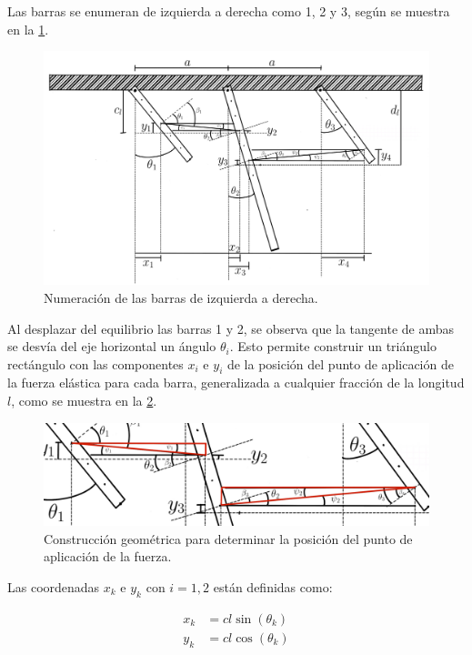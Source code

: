 Las barras se enumeran de izquierda a derecha como 1, 2 y 3, según se muestra en la \cref{fig:enumeracion_barras}.

\begin{figure}[htbp!]
    \centering
    \includegraphics[width=0.8\linewidth]{Figures/Ilustración_sin_título 4.pdf}
    \caption{Numeración de las barras de izquierda a derecha.}
    \label{fig:enumeracion_barras}
\end{figure}

Al desplazar del equilibrio las barras 1 y 2, se observa que la tangente de ambas se desvía del eje horizontal un ángulo \(\theta_i\). Esto permite construir un triángulo rectángulo con las componentes \(x_i\) e \(y_i\) de la posición del punto de aplicación de la fuerza elástica para cada barra, generalizada a cualquier fracción de la longitud \(l\), como se muestra en la \cref{fig:triangulo_posicion}.

\begin{figure}[htbp!]
    \centering
    \includegraphics[width=0.8\linewidth]{Figures/Ilustración_sin_título 5.pdf}
    \caption{Construcción geométrica para determinar la posición del punto de aplicación de la fuerza.}
    \label{fig:triangulo_posicion}
\end{figure}

Las coordenadas \(x_k\) e \(y_k\) con \(i = 1, 2\) están definidas como:

\begin{align}
x_k &= c l \sin(\theta_{k}) \\
y_k &= c l \cos(\theta_{k})
\end{align}

